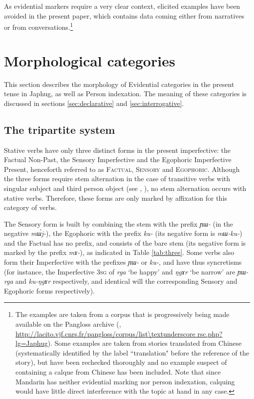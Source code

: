 \documentclass[11pt]{article}
\newcommand{\ipa}[1]{{\phon\textit{#1}}} %
\begin{document}
As evidential markers require a very clear context, elicited examples have been avoided in the present paper, which contains data coming either from narratives or from conversations.\footnote{ The examples are taken from a corpus that is progressively being made available on the Pangloss archive  (\citealt{michailovsky14pangloss}, 
 \url{http://lacito.vjf.cnrs.fr/pangloss/corpus/list\textunderscore rsc.php?lg=Japhug}). Some examples are taken from stories translated from Chinese (systematically identified by the label ``translation" before the reference of the story), but have been rechecked thoroughly and no example suspect of containing a calque from Chinese has been included. Note that since Mandarin has neither evidential marking nor person indexation, calquing would have little direct interference with the topic at hand in any case.}

\section{Morphological categories} \label{sec:morph}
This section describes the morphology of Evidential categories in the present tense in Japhug, as well as Person indexation. The meaning of these categories is discussed in sections \ref{sec:declarative} and \ref{sec:interrogative}.

\subsection{The tripartite system}
Stative verbs have only three distinct forms in the present imperfective: the Factual Non-Past, the Sensory Imperfective and the Egophoric Imperfective Present, henceforth referred to as \textsc{Factual}, \textsc{Sensory} and \textsc{Egophoric}. Although the three forms require stem alternation in the case of transitive verbs with singular subject and third person object (see \citealt{jackson00sidaba}, \citealt[267]{jacques14linking}), no stem alternation occurs with stative verbs. Therefore, these forms are only marked by affixation for this category of verbs.

The Sensory form is built by combining the stem with the  prefix \ipa{ɲɯ-} (in the negative \ipa{mɯ́j-}), the Egophoric with the prefix \ipa{ku-} (its negative form is \ipa{mɯ-ku-}) and the Factual has no prefix, and consists of the bare stem (its negative form is marked by the prefix \ipa{mɤ-}), as indicated in Table \ref{tab:three}. Some verbs also form their Imperfective with the prefixes \ipa{ɲɯ-} or \ipa{ku-}, and have thus syncretisms (for instance, the Imperfective \textsc{3sg} of \ipa{rga} `be happy' and \ipa{ŋgɤr} `be narrow' are \ipa{ɲɯ-rga} and \ipa{ku-ŋgɤr} respectively, and identical will the corresponding Sensory and Egophoric forms respectively).
\end{document}
